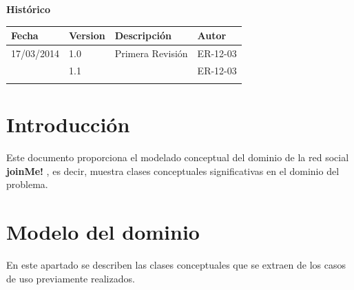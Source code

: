 \documentclass[12pt, a4paper, titlepage]{article}
\begin{document}
\begin{titlepage}
\vspace{2cm}

\begin{center}
	\large{\textbf{Histórico}}
	
    \begin{tabular}{ | p{4cm} | p{2cm} | p{6cm} | p{3cm} |}
    \hline
    \textbf{Fecha} & \textbf{Version} & \textbf{Descripción} & \textbf{Autor} \\ \hline
      17/03/2014 & 1.0 & Primera Revisión & ER-12-03\\ \hline
      & 1.1 &  & ER-12-03\\ \hline
     &  & &\\ \hline
    \end{tabular}
\end{center}

\end{titlepage}
\clearpage


\tableofcontents
\clearpage

\section{Introducción}
Este documento proporciona el modelado conceptual del dominio de la red social \textbf{joinMe!} , es decir,
muestra clases conceptuales significativas en el dominio del problema.


\section{Modelo del dominio}

En este apartado se describen las clases conceptuales que se extraen de los casos de uso previamente realizados.
\end{document}
